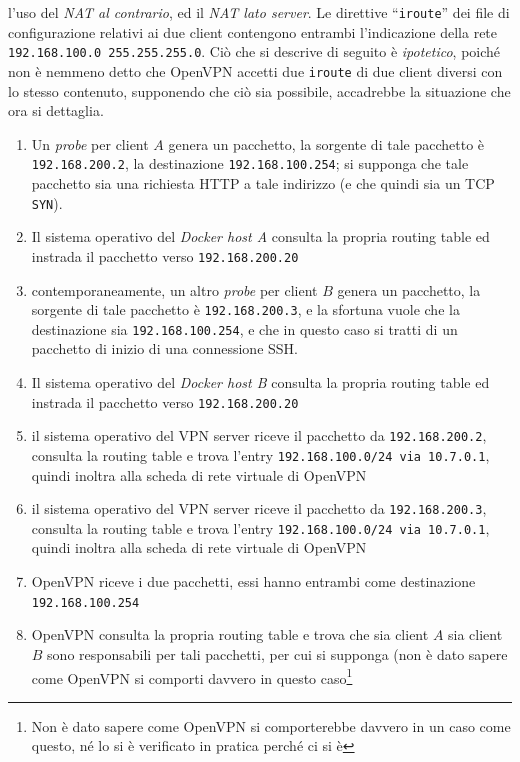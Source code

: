 l'uso del \textit{NAT al contrario}, ed il \textit{NAT lato server}. Le direttive
``\texttt{iroute}'' dei file di configurazione relativi ai due client contengono
entrambi l'indicazione della rete \texttt{192.168.100.0 255.255.255.0}.
Ciò che si descrive di seguito è \textit{ipotetico}, poiché non è nemmeno detto che
OpenVPN accetti due \texttt{iroute} di due client diversi con lo stesso contenuto,
supponendo che ciò sia possibile, accadrebbe la situazione che ora si dettaglia.
\begin{enumerate}
  \item Un \textit{probe} per client $A$ genera un pacchetto, la sorgente di tale pacchetto è
  \texttt{192.168.200.2}, la destinazione \texttt{192.168.100.254}; si supponga che
  tale pacchetto sia una richiesta HTTP a tale indirizzo (e che quindi sia un TCP \texttt{SYN}).
  \item Il sistema operativo del \textit{Docker host A} consulta la propria routing table
  ed instrada il pacchetto verso \texttt{192.168.200.20}
  \item contemporaneamente, un altro \textit{probe} per client $B$ genera un pacchetto,
  la sorgente di tale pacchetto è
  \texttt{192.168.200.3}, e la sfortuna vuole che la destinazione sia
  \texttt{192.168.100.254}, e che in questo caso si tratti di un pacchetto  di inizio
  di una connessione SSH.
  \item Il sistema operativo del \textit{Docker host B} consulta la propria routing table
  ed instrada il pacchetto verso \texttt{192.168.200.20}
  \item il sistema operativo del VPN server riceve il pacchetto da \texttt{192.168.200.2},
  consulta la
  routing table e trova l'entry \texttt{192.168.100.0/24 via 10.7.0.1}, quindi inoltra
  alla scheda di rete virtuale di OpenVPN
  \item il sistema operativo del VPN server riceve il pacchetto da \texttt{192.168.200.3},
  consulta la
  routing table e trova l'entry \texttt{192.168.100.0/24 via 10.7.0.1}, quindi inoltra
  alla scheda di rete virtuale di OpenVPN
  \item OpenVPN riceve i due pacchetti,
  essi hanno entrambi come destinazione \texttt{192.168.100.254}
  \item OpenVPN consulta la propria routing table e trova che sia client $A$ sia client $B$
  sono responsabili per tali pacchetti, per cui si supponga (non è dato sapere come OpenVPN
  si comporti davvero in questo caso\footnote{Non è dato sapere come OpenVPN si comporterebbe
  davvero in un caso come questo, né lo si è verificato in pratica perché ci si è
}
\end{enumerate}
